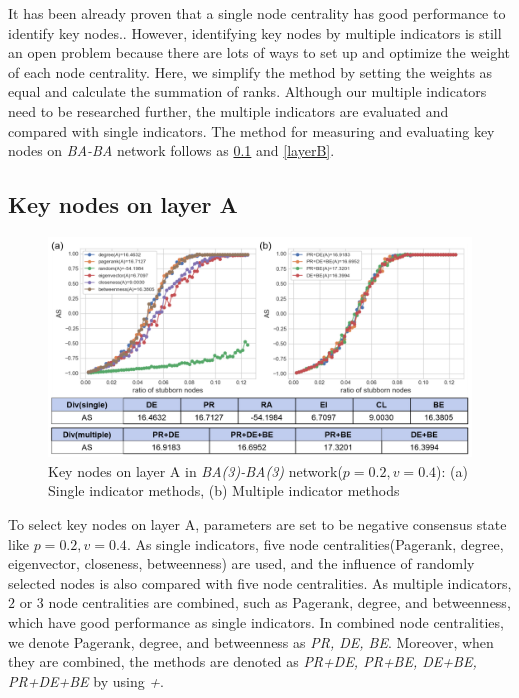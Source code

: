 It has been already proven that a single node centrality has good performance to identify key nodes.\parencite{koschutzki2008, francisco2019, bianconi2018}. However, identifying key nodes by multiple indicators is still an open problem because there are lots of ways to set up and optimize the weight of each node centrality.\parencite{huang2014}  Here, we simplify the method by setting the weights as equal and calculate the summation of ranks. Although our multiple indicators need to be researched further, the multiple indicators are evaluated and compared with single indicators. The method for measuring and evaluating key nodes on \textit{BA-BA} network follows as \ref{layerA} and \ref{layerB}.\\
 
\subsection{Key nodes on layer A}
\label{layerA}
\begin{figure}[!htb]
	\centering
	\includegraphics[width=\hsize]{figure/chap5_keynode_A.png}
	\caption{Key nodes on layer A in \textit{BA(3)-BA(3)} network($p=0.2, v=0.4$): (a) Single indicator methods, (b) Multiple indicator methods}
	\label{chap5_keynode_A}
\end{figure}
To select key nodes on layer A, parameters are set to be negative consensus state like $p=0.2, v=0.4$.  As single indicators, five node centralities(Pagerank, degree, eigenvector, closeness, betweenness) are used, and the influence of randomly selected nodes is also compared with five node centralities. As multiple indicators, $2$ or $3$ node centralities are combined, such as Pagerank, degree, and betweenness, which have good performance as single indicators. In combined node centralities, we denote Pagerank, degree, and betweenness as \textit{PR, DE, BE}. Moreover, when they are combined, the methods are denoted as \textit{PR+DE, PR+BE, DE+BE, PR+DE+BE} by using \textit{+}. 

